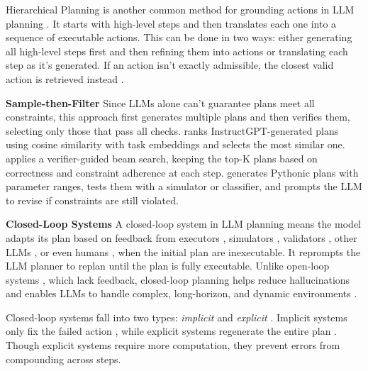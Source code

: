 Hierarchical Planning is another common method for grounding actions in LLM planning \citep{huang2022language, raman2022planning, song2023llm, hazra2024saycanpay, bhat2024grounding}. It starts with high-level steps and then translates each one into a sequence of executable actions. This can be done in two ways: either generating all high-level steps first and then refining them into actions or translating each step as it's generated. If an action isn't exactly admissible, the closest valid action is retrieved instead \citep{huang2022language, raman2022planning}. \smallskip

\noindent\textbf{Sample-then-Filter} Since LLMs alone can't guarantee plans meet all constraints, this approach first generates multiple plans and then verifies them, selecting only those that pass all checks. \citet{yuan2023distilling} ranks InstructGPT-generated plans using cosine similarity with task embeddings and selects the most similar one. \citet{brahmanplasma} applies a verifier-guided beam search, keeping the top-K plans based on correctness and constraint adherence at each step. \citet{curtis2024trust} generates Pythonic plans with parameter ranges, tests them with a simulator or classifier, and prompts the LLM to revise if constraints are still violated. \smallskip

\noindent\textbf{Closed-Loop Systems} 
A closed-loop system in LLM planning means the model adapts its plan based on feedback from executors \cite{prasad2023adapt, yang2024selfgoal}, simulators \cite{bhat2024grounding}, validators \cite{zhou2024isr, silver2024generalized}, other LLMs \cite{wang2023describe}, or even humans \cite{huang2022inner}, when the initial plan are inexecutable. It reprompts the LLM planner to replan 
until the plan is fully executable. Unlike open-loop systems \cite{huang2022language}, which lack feedback, closed-loop planning helps reduce hallucinations and enables LLMs to handle complex, long-horizon, and dynamic environments \cite{wang2023describe}.

Closed-loop systems fall into two types: \emph{implicit} and \emph{explicit} \cite{sun2024adaplanner}. Implicit systems only fix the failed action \cite{raman2022planning, singh2023progprompt, zhou2024isr, prasad2023adapt, yang2024selfgoal}, while explicit systems regenerate the entire plan \cite{sun2024adaplanner}. Though explicit systems require more computation, they prevent errors from compounding across steps.
